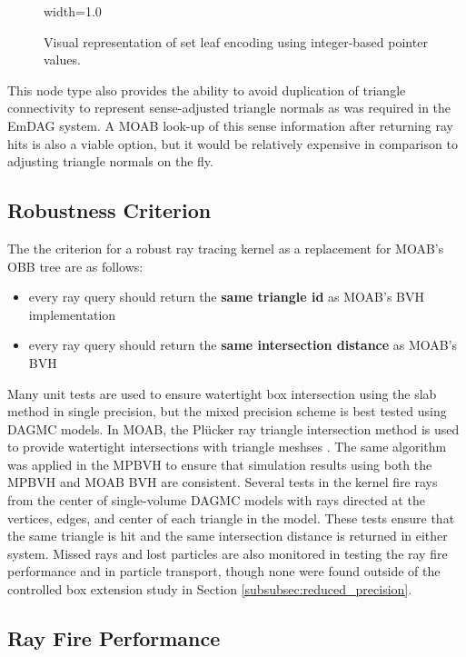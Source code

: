 \begin{figure}
  {width=1.0\textwidth}
  \caption[Graphic of surface root node encoding.]{Visual representation of set
    leaf encoding using integer-based pointer values.}
  \label{fig:set_leaf_encoding}
\end{figure}

This node type also provides the ability to avoid duplication of triangle
connectivity to represent sense-adjusted triangle normals as was required in the
EmDAG system. A MOAB look-up of this sense information after returning ray hits
is also a viable option, but it would be relatively expensive in comparison
to adjusting triangle normals on the fly.

\subsection{Robustness Criterion}

The the criterion for a robust ray tracing kernel as a replacement for MOAB's
OBB tree are as follows:

\begin{itemize}
  \item every ray query should return the \textbf{same triangle id} as MOAB's BVH
    implementation
  \item every ray query should return the \textbf{same intersection distance} as MOAB's BVH
\end{itemize}

Many unit tests are used to ensure watertight box intersection using the slab
method \cite{Kay_1986} in single precision, but the mixed precision scheme is
best tested using DAGMC models. In MOAB, the Pl\"{u}cker ray triangle
intersection method is used to provide watertight intersections with triangle
meshses \cite{Platis_2003}. The same algorithm was applied in the MPBVH to
ensure that simulation results using both the MPBVH and MOAB BVH are
consistent. Several tests in the kernel fire rays from the center of
single-volume DAGMC models with rays directed at the vertices, edges, and center
of each triangle in the model. These tests ensure that the same triangle is hit
and the same intersection distance is returned in either
system. Missed rays and lost particles are also monitored in testing the ray fire
performance and in particle transport, though none were found outside of the
controlled box extension study in Section \ref{subsubsec:reduced_precision}.

\subsection{Ray Fire Performance}\label{sec:mpbvh_rf_perf}

